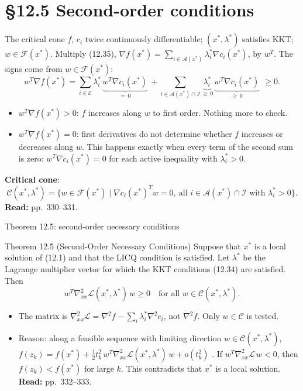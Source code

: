 \documentclass[aspectratio=169,12pt]{beamer}
\newcommand{\xs}{x^{*}}
\newcommand{\gradf}{\nabla f}
\newcommand{\hessf}{\nabla^{2} f}
\newcommand{\eqn}[1]{\text{\small(#1)}}
\newcommand{\readbook}[1]{{\color{red}\textbf{Read:} #1}}
\newcommand{\ls}{\lambda^{*}}
\newcommand{\cA}{\mathcal{A}}
\newcommand{\cC}{\mathcal{C}}
\newcommand{\cE}{\mathcal{E}}
\newcommand{\cF}{\mathcal{F}}
\newcommand{\cI}{\mathcal{I}}
\newcommand{\cL}{\mathcal{L}}
\newcommand{\hessL}{\nabla_{xx}^{2}\cL}
\begin{document}
\section{\S12.5 Second-order conditions}

\begin{frame}{The critical cone}
  $f$, $c_{i}$ twice continuously differentiable; $(\xs,\ls)$ satisfies KKT; $w\in\cF(\xs)$.
  Multiply (12.35), $\gradf(\xs)=\sum_{i\in\cA(\xs)}\ls_{i}\nabla c_{i}(\xs)$, by $w^{T}$. The signs come from $w\in\cF(\xs)$:
  \[ w^{T}\gradf(\xs)=\sum_{i\in\cE}\ls_{i}\,\underbrace{w^{T}\nabla c_{i}(\xs)}_{=\,0}
     \ +\sum_{i\in\cA(\xs)\cap\cI}\underbrace{\ls_{i}}_{\ge\,0}\,\underbrace{w^{T}\nabla c_{i}(\xs)}_{\ge\,0}\ \ \ge 0 . \]
  \begin{itemize}\setlength\itemsep{0.4em}
    \item $w^{T}\gradf(\xs)>0$: $f$ increases along $w$ to first order. Nothing more to check.
    \item $w^{T}\gradf(\xs)=0$: first derivatives do not determine whether $f$ increases or decreases
      along $w$. This happens exactly when every term of the second sum is zero:
      $w^{T}\nabla c_{i}(\xs)=0$ for each active inequality with $\ls_{i}>0$.
  \end{itemize}
  \textbf{Critical cone}:
  \[ \cC(\xs,\ls)=\{w\in\cF(\xs)\mid\nabla c_{i}(\xs)^{T}w=0,\ \text{all } i\in\cA(\xs)\cap\cI \text{ with } \ls_{i}>0\} . \]
  \readbook{pp.~330--331.}
\end{frame}

\begin{frame}{Theorem 12.5: second-order necessary conditions}
  \begin{block}{Theorem 12.5 (Second-Order Necessary Conditions)}
    Suppose that $\xs$ is a local solution of (12.1) and that the LICQ condition is satisfied. Let $\ls$
    be the Lagrange multiplier vector for which the KKT conditions (12.34) are satisfied. Then
    \[ w^{T}\hessL(\xs,\ls)\,w\ge 0\quad\text{for all } w\in\cC(\xs,\ls) . \tag{12.57} \]
  \end{block}
  \begin{itemize}\setlength\itemsep{0.3em}
    \item The matrix is $\hessL=\hessf-\sum_{i}\ls_{i}\nabla^{2}c_{i}$, not $\hessf$.
      Only $w\in\cC$ is tested.
    \item Reason: along a feasible sequence with limiting direction $w\in\cC(\xs,\ls)$,
      $f(z_{k})=f(\xs)+\tfrac12 t_{k}^{2}\,w^{T}\hessL(\xs,\ls)\,w+o(t_{k}^{2})$ \eqn{12.64}. If $w^{T}\hessL\,w<0$,
      then $f(z_{k})<f(\xs)$ for large $k$. This contradicts that $\xs$ is a local solution.
      \readbook{pp.~332--333.}
  \end{itemize}
\end{frame}
\end{document}

